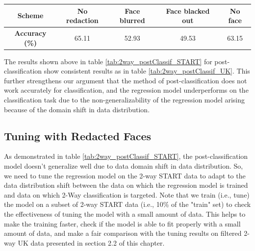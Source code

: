 \begin{table}[h]
\begin{tabular}{|c||c|c|c|c|}
      \hline
      \textbf{Scheme} & No redaction & Face blurred & Face blacked out & No face \\
      \hline
      \textbf{Accuracy (\%)} & 65.11 & 52.93 & 49.53 & 63.15 \\
      \hline
    \end{tabular}  
\end{table}

The results shown above in table \ref{tab:2way_postClassif_START} for post-classification show consistent results as in table \ref{tab:2way_postClassif_UK}. This further strengthens our argument that the method of post-classification does not work accurately for classification, and the regression model underperforms on the classification task due to the non-generalizability of the regression model arising because of the domain shift in data distribution.


\subsection{Tuning with Redacted Faces}
As demonstrated in table \ref{tab:2way_postClassif_START}, the post-classification model doesn't generalize well due to data domain shift in data distribution. So, we need to tune the regression model on the 2-way START data to adapt to the data distribution shift between the data on which the regression model is trained and data on which 2-Way classification is targeted. Note that we train (i.e., tune) the model on a subset of 2-way START data (i.e., 10\% of the "train" set) to check the effectiveness of tuning the model with a small amount of data. This helps to make the training faster, check if the model is able to fit properly with a small amount of data, and make a fair comparison with the tuning results on filtered 2-way UK data presented in section 2.2 of this chapter.


